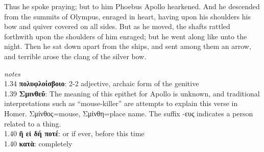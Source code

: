 \documentclass{ransom}
\begin{document}
Thus he spoke praying; but to him Phoebus Apollo hearkened. And he
descended from the summits of Olympus, enraged in heart, having upon
his shoulders his bow and quiver covered on all sides. But as he moved,
the shafts rattled forthwith upon the shoulders of him enraged; but
he went along like unto the night. Then he sat down apart from the
ships, and sent among them an arrow, and terrible arose the clang of
the silver bow.
    \par
    \textit{notes}\\
    1.34 \textbf{πολυφλοίσβοιο}: 2-2 adjective, archaic form of the genitive\\1.39 \textbf{Σμινθεῦ}: The meaning of this epithet for Apollo is unknown, and traditional interpretations such as ``mouse-killer''
                          are attempts to explain this verse in Homer. Σμίνθος=mouse, Σμίνθη=place name. The suffix -ευς indicates a person
                          related to a thing.\\1.40 \textbf{ἢ εἰ δή ποτέ}: or if ever, before this time\\1.40 \textbf{κατὰ}: completely
\end{document}
